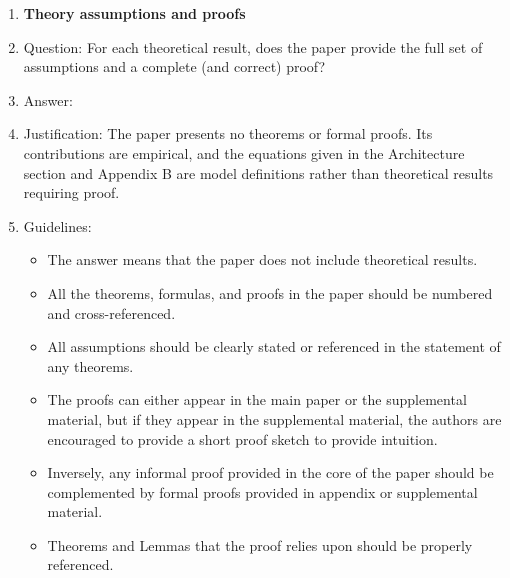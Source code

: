 \begin{enumerate}
\begin{itemize}
        \item If applicable, the authors should discuss possible limitations of their approach to address problems of privacy and fairness.
        \item While the authors might fear that complete honesty about limitations might be used by reviewers as grounds for rejection, a worse outcome might be that reviewers discover limitations that aren't acknowledged in the paper. The authors should use their best judgment and recognize that individual actions in favor of transparency play an important role in developing norms that preserve the integrity of the community. Reviewers will be specifically instructed to not penalize honesty concerning limitations.
    \end{itemize}

\item {\bf Theory assumptions and proofs}
    \item[] Question: For each theoretical result, does the paper provide the full set of assumptions and a complete (and correct) proof?
    \item[] Answer: \answerNA{}
    \item[] Justification: The paper presents no theorems or formal proofs. Its contributions are empirical, and the equations given in the Architecture section and Appendix B are model definitions rather than theoretical results requiring proof.
    \item[] Guidelines:
    \begin{itemize}
        \item The answer \answerNA{} means that the paper does not include theoretical results. 
        \item All the theorems, formulas, and proofs in the paper should be numbered and cross-referenced.
        \item All assumptions should be clearly stated or referenced in the statement of any theorems.
        \item The proofs can either appear in the main paper or the supplemental material, but if they appear in the supplemental material, the authors are encouraged to provide a short proof sketch to provide intuition. 
        \item Inversely, any informal proof provided in the core of the paper should be complemented by formal proofs provided in appendix or supplemental material.
        \item Theorems and Lemmas that the proof relies upon should be properly referenced. 
    \end{itemize}


\end{enumerate}
